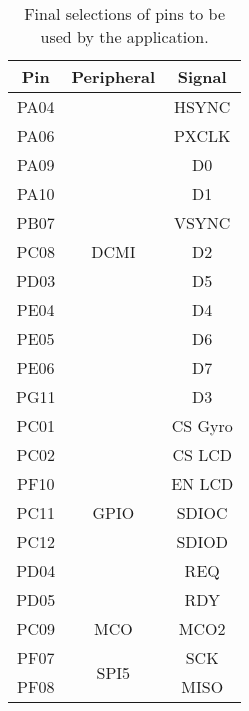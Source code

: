 \begin{table}[ht!]
\begin{center}
\begin{tabular}{| c | c | c |}
\hline
Pin	&	Peripheral	&	Signal\\ \hline
PA04	&	\multirow{11}{*}{DCMI}	&	HSYNC\\
PA06	&		&	PXCLK\\
PA09	&		&	D0\\
PA10	&		&	D1\\
PB07	&		&	VSYNC\\
PC08	&		&	D2\\
PD03	&		&	D5\\
PE04	&		&	D4\\
PE05	&		&	D6\\
PE06	&		&	D7\\
PG11	&		&	D3\\ \hline
PC01	&	\multirow{7}{*}{GPIO}	&	CS Gyro\\
PC02	&		&	CS LCD\\
PF10	&		&	EN LCD\\ 
PC11	&		&	SDIOC\\
PC12	&		&	SDIOD\\
PD04	&		&	REQ\\
PD05	&		&	RDY\\ \hline
PC09	&	MCO	&	MCO2\\ \hline
PF07	&	\multirow{2}{*}{SPI5}	&	SCK\\
PF08	&		&	MISO\\ \hline
\end{tabular}
\caption[Final selections of pins.]{Final selections of pins to be used by the application.}
\label{tab_boardpin_final}
\end{center}
\end{table}
